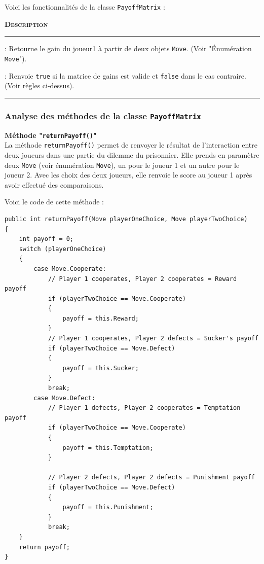 \documentclass[a4paper, french]{article}
\begin{document}
Voici les fonctionnalités de la classe \texttt{PayoffMatrix} :

\vspace{0.25cm}
\begin{description}
    \small
    \item[\textbf{\textsc{Méthode}}] \hspace{30pt}\textbf{\textsc{Description}}
    \vspace{0.1cm}
    \hrule{}
    \item[\texttt{returnPayoff()}] : Retourne le gain du joueur1 à partir de deux objets \texttt{Move}. (Voir "Énumération \texttt{Move}").
    \item[\texttt{isValid()}] :  Renvoie \texttt{true} si la matrice de gains est valide et \texttt{false} dans le cas contraire. (Voir règles ci-dessus).
\end{description}
\vspace{0.25cm}
\hrule{}
\vspace{0.5cm}
\pagebreak

\subsubsection{Analyse des méthodes de la classe \texttt{PayoffMatrix}}
\textbf{Méthode "\texttt{returnPayoff()}"}\\
La méthode \texttt{returnPayoff()} permet de renvoyer le résultat de l'interaction entre deux joueurs dans une partie du dilemme du prisonnier. Elle prends en paramètre deux \texttt{Move} (voir énumération \texttt{Move}), un pour le joueur 1 et un autre pour le joueur 2. Avec les choix des deux joueurs, elle renvoie le score au joueur 1 après avoir effectué des comparaisons.

Voici le code de cette méthode :
\begin{lstlisting}
public int returnPayoff(Move playerOneChoice, Move playerTwoChoice)
{
    int payoff = 0;
    switch (playerOneChoice)
    {
        case Move.Cooperate:
            // Player 1 cooperates, Player 2 cooperates = Reward payoff
            if (playerTwoChoice == Move.Cooperate)
            {
                payoff = this.Reward;
            }
            // Player 1 cooperates, Player 2 defects = Sucker's payoff
            if (playerTwoChoice == Move.Defect)
            {
                payoff = this.Sucker;
            }
            break;
        case Move.Defect:
            // Player 1 defects, Player 2 cooperates = Temptation payoff
            if (playerTwoChoice == Move.Cooperate)
            {
                payoff = this.Temptation;
            }

            // Player 2 defects, Player 2 defects = Punishment payoff
            if (playerTwoChoice == Move.Defect)
            {
                payoff = this.Punishment;
            }
            break;
    }
    return payoff;
}
\end{lstlisting}
\end{document}
